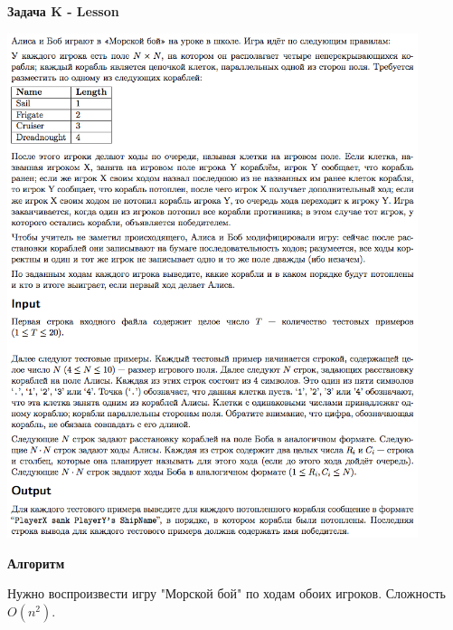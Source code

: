 \documentclass[a4paper,12pt]{article}
\begin{document}
\newpage
\textbf{{\large Задача K - Lesson}}

\begin{center}
\includegraphics[width=0.9\textwidth]{OC_Karelia/OC_Karelia_K.png}\\ [1cm]
\end{center}
\newpage

\textbf{{\large Алгоритм}}

Нужно воспроизвести игру "Морской бой" по ходам обоих игроков. Сложность $O(n^2)$. \\
\end{document}
